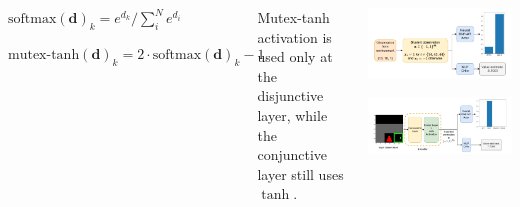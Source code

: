 \documentclass{tikzposter} %
\newcommand{\softmax}{\text{softmax}}
\newcommand{\mutextanh}{\text{mutex-tanh}}
\begin{document}
\begin{columns}
{        \begin{center}
            $\softmax(\mathbf{d})_k = e^{d_{k}} / \sum_{i}^{N} e^{d_{i}}$

            $\mutextanh(\mathbf{d})_k = 2 \cdot \softmax(\mathbf{d})_k - 1$
        \end{center}

        Mutex-tanh activation is used only at the
        disjunctive layer, while the conjunctive layer still uses $\tanh$.

    }




     {

        \begin{center}

            \vspace{-0.5em}

            \includegraphics[width=\colwidth]{img/binary-ndnf-mt-ac}


            \vspace{-0.5em}

            \includegraphics[width=\colwidth]{img/image-ndnf-mt-ac}


\end{center}}
\end{columns}
\end{document}
